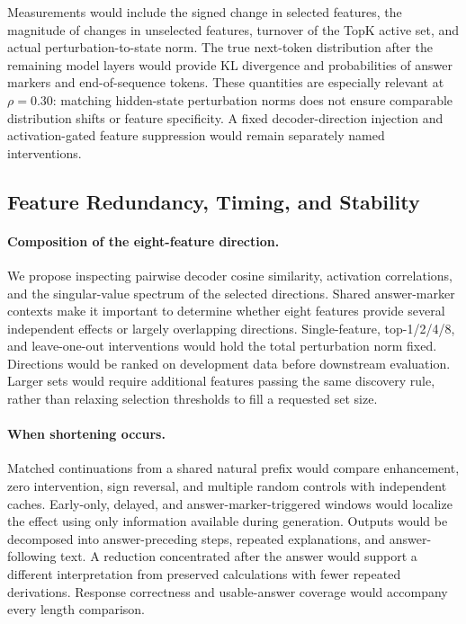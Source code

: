 Measurements would include the signed change in selected features, the magnitude of changes in unselected features, turnover of the TopK active set, and actual perturbation-to-state norm.
The true next-token distribution after the remaining model layers would provide KL divergence and probabilities of answer markers and end-of-sequence tokens.
These quantities are especially relevant at $\rho=0.30$: matching hidden-state perturbation norms does not ensure comparable distribution shifts or feature specificity.
A fixed decoder-direction injection and activation-gated feature suppression would remain separately named interventions.

\subsection{Feature Redundancy, Timing, and Stability}
\label{sec:sae_structure}

\paragraph{Composition of the eight-feature direction.}
We propose inspecting pairwise decoder cosine similarity, activation correlations, and the singular-value spectrum of the selected directions.
Shared answer-marker contexts make it important to determine whether eight features provide several independent effects or largely overlapping directions.
Single-feature, top-1/2/4/8, and leave-one-out interventions would hold the total perturbation norm fixed.
Directions would be ranked on development data before downstream evaluation.
Larger sets would require additional features passing the same discovery rule, rather than relaxing selection thresholds to fill a requested set size.

\paragraph{When shortening occurs.}
Matched continuations from a shared natural prefix would compare enhancement, zero intervention, sign reversal, and multiple random controls with independent caches.
Early-only, delayed, and answer-marker-triggered windows would localize the effect using only information available during generation.
Outputs would be decomposed into answer-preceding steps, repeated explanations, and answer-following text.
A reduction concentrated after the answer would support a different interpretation from preserved calculations with fewer repeated derivations.
Response correctness and usable-answer coverage would accompany every length comparison.

